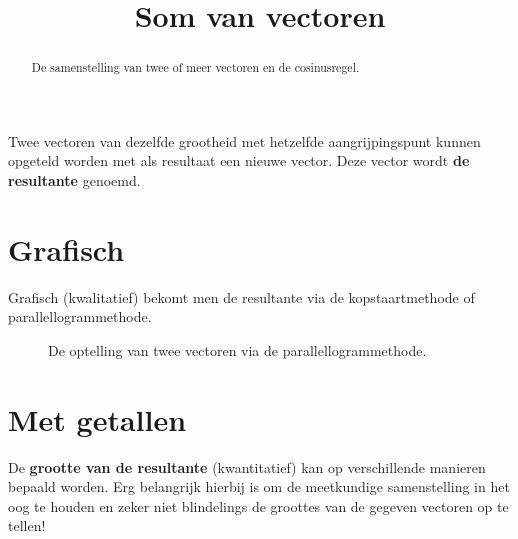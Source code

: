 \documentclass{ximera}
\title{Som van vectoren}
\begin{document}
\begin{abstract}
    De samenstelling van twee of meer vectoren en de cosinusregel.
\end{abstract}
\maketitle

Twee vectoren van dezelfde grootheid met hetzelfde aangrijpingspunt kunnen opgeteld worden met als resultaat een nieuwe vector. Deze vector wordt \textbf{de resultante} genoemd. 

\section{Grafisch}
Grafisch (kwalitatief) bekomt men de resultante via de kopstaartmethode of parallellogrammethode.  

\begin{figure}[ht!]
    \captionsetup{width=0.85\textwidth}
    \begin{center}
    \end{center}
    \caption{De optelling van twee vectoren via de parallellogrammethode.}
    \label{fig:som_vectoren}
\end{figure}

\section{Met getallen}\label{s:vectoren_optellen}
De \textbf{grootte van de resultante} (kwantitatief) kan op verschillende manieren bepaald worden. Erg belangrijk hierbij is om de meetkundige samenstelling in het oog te houden en zeker niet blindelings de groottes van de gegeven vectoren op te tellen! 
\end{document}

